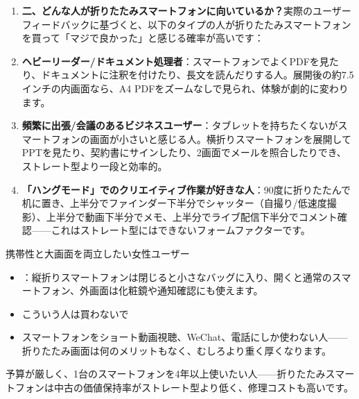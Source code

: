 \begin{enumerate}
  \item \textbf{二、どんな人が折りたたみスマートフォンに向いているか？}実際のユーザーフィードバックに基づくと、以下のタイプの人が折りたたみスマートフォンを買って「マジで良かった」と感じる確率が高いです：
  \item \textbf{ヘビーリーダー/ドキュメント処理者}：スマートフォンでよくPDFを見たり、ドキュメントに注釈を付けたり、長文を読んだりする人。展開後の約7.5インチの内画面なら、A4 PDFをズームなしで見られ、体験が劇的に変わります。
  \item \textbf{頻繁に出張/会議のあるビジネスユーザー}：タブレットを持ちたくないがスマートフォンの画面が小さいと感じる人。横折りスマートフォンを展開してPPTを見たり、契約書にサインしたり、2画面でメールを照合したりでき、ストレート型より一段と効率的。
  \item \textbf{「ハングモード」でのクリエイティブ作業が好きな人}：90度に折りたたんで机に置き、上半分でファインダー下半分でシャッター（自撮り/低速度撮影）、上半分で動画下半分でメモ、上半分でライブ配信下半分でコメント確認——これはストレート型にはできないフォームファクターです。
\end{enumerate}

\begin{tcbwarn}{携帯性と大画面を両立したい女性ユーザー}
\begin{itemize}
  \item ：縦折りスマートフォンは閉じると小さなバッグに入り、開くと通常のスマートフォン、外画面は化粧鏡や通知確認にも使えます。
  \item こういう人は買わないで
  \item スマートフォンをショート動画視聴、WeChat、電話にしか使わない人——折りたたみ画面は何のメリットもなく、むしろより重く厚くなります。
\end{itemize}

\end{tcbwarn}


予算が厳しく、1台のスマートフォンを4年以上使いたい人——折りたたみスマートフォンは中古の価値保持率がストレート型より低く、修理コストも高いです。

